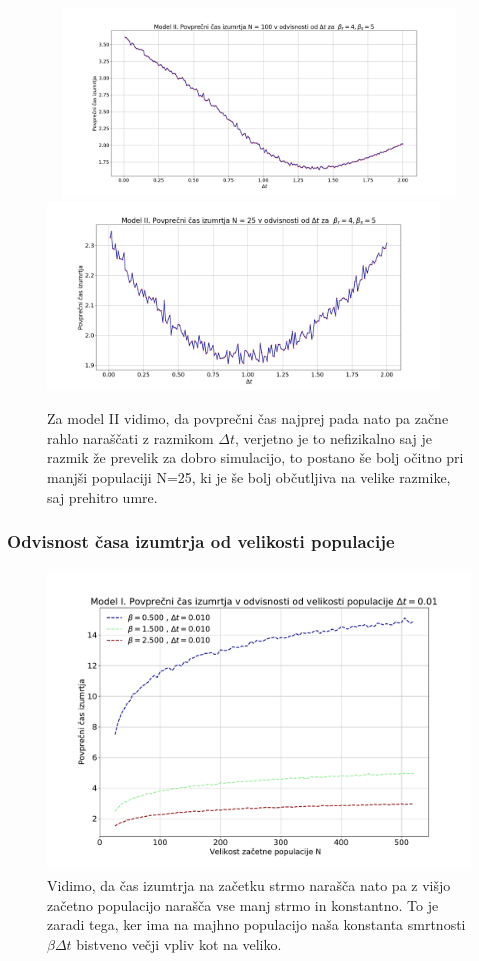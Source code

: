 \documentclass[11pt, a4paper]{article}
\begin{document}
   \begin{figure}[H]
\centering

  \includegraphics[width=18cm, height=5cm]{prva_tretji_del3.png}
  \includegraphics[width=18 cm, height=5cm]{prva_tretji_del3b.png}
     \caption{Za model II vidimo, da povprečni čas najprej pada nato pa začne rahlo naraščati z razmikom $\Delta t$, verjetno je to nefizikalno saj je razmik že prevelik za dobro simulacijo, to postano še bolj očitno pri manjši populaciji N=25, ki je še bolj občutljiva na velike razmike, saj prehitro umre.}
     \end{figure}
     \subsubsection{Odvisnost časa izumtrja od velikosti populacije}
       \begin{figure}[H]
\centering

  \includegraphics[width=16cm, height=8cm]{prva_velikost.pdf}

     \caption{Vidimo, da čas izumtrja na začetku strmo narašča nato pa z višjo začetno populacijo narašča vse manj strmo in konstantno. To je zaradi tega, ker ima na majhno populacijo naša konstanta smrtnosti $\beta \Delta t$ bistveno večji vpliv kot na veliko.}
     \end{figure}
\end{document}
